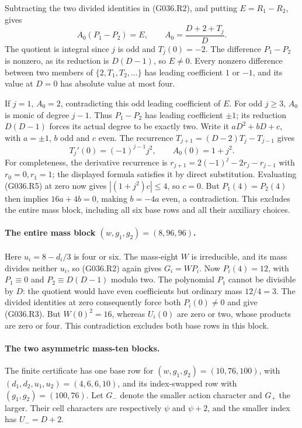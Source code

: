 Subtracting the two divided identities in (G036.R2),
and putting $E=R_1-R_2$, gives
\[
 A_0(P_1-P_2)=E,\qquad
 A_0=\frac{D+2+T_j}{D}.                             \tag{G036.R5}
\]
The quotient is integral since $j$ is odd and
$T_j(0)=-2$. The difference $P_1-P_2$ is nonzero,
as its reduction is $D(D-1)$, so $E\ne0$.
Every nonzero difference between two members of
$\{2,T_1,T_2,\ldots\}$ has leading coefficient
$1$ or $-1$, and its value at $D=0$ has absolute
value at most four.

If $j=1$, $A_0=2$, contradicting this odd leading
coefficient of $E$.
For odd $j\ge3$, $A_0$ is monic of degree $j-1$.
Thus $P_1-P_2$ has leading coefficient $\pm1$;
its reduction $D(D-1)$ forces its actual degree
to be exactly two. Write it $aD^2+bD+c$, with
$a=\pm1$, $b$ odd and $c$ even.
The recurrence $T_{j+1}=(D-2)T_j-T_{j-1}$ gives
\[
 T_j'(0)=(-1)^{j-1}j^2,\qquad A_0(0)=1+j^2.
\]
For completeness, the derivative recurrence is
$r_{j+1}=2(-1)^j-2r_j-r_{j-1}$ with
$r_0=0,r_1=1$; the displayed formula satisfies it
by direct substitution.
Evaluating (G036.R5) at zero now gives
$|(1+j^2)c|\le4$, so $c=0$.
But $P_1(4)=P_2(4)$ then implies
$16a+4b=0$, making $b=-4a$ even, a contradiction.
This excludes the entire mass block, including
all six base rows and all their auxiliary choices.

\paragraph{The entire mass block $(w,g_1,g_2)=(8,96,96)$.}
Here $u_i=8-d_i/3$ is four or six.
The mass-eight $W$ is irreducible, and its mass
divides neither $u_i$, so (G036.R2) again gives
$G_i=WP_i$. Now $P_i(4)=12$, with
$P_1\equiv0$ and $P_2\equiv D(D-1)$ modulo two.
The polynomial $P_1$ cannot be divisible by $D$:
the quotient would have even coefficients but
ordinary mass $12/4=3$.
The divided identities at zero consequently
force both $P_i(0)\ne0$ and give (G036.R3).
But $W(0)^2=16$, whereas $U_i(0)$ are zero or two,
whose products are zero or four. This contradiction
excludes both base rows in this block.

\paragraph{The two asymmetric mass-ten blocks.}
The finite certificate has one base row for
$(w,g_1,g_2)=(10,76,100)$, with
$(d_1,d_2,u_1,u_2)=(4,6,6,10)$, and its index-swapped
row with $(g_1,g_2)=(100,76)$.
Let $G_-$ denote the smaller action character and
$G_+$ the larger. Their cell characters are
respectively $\psi$ and $\psi+2$, and the smaller
index has $U_-=D+2$.

